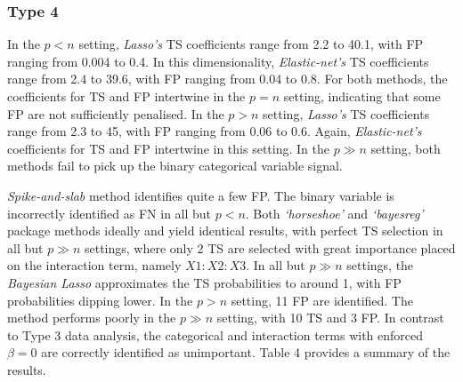 \documentclass[
  11pt,
]{article}
\begin{document}
\subsubsection{Type 4}

In the \(p<n\) setting, \emph{Lasso's} TS coefficients range from 2.2 to
40.1, with FP ranging from 0.004 to 0.4. In this dimensionality,
\emph{Elastic-net's} TS coefficients range from 2.4 to 39.6, with FP
ranging from 0.04 to 0.8. For both methods, the coefficients for TS and
FP intertwine in the \(p=n\) setting, indicating that some FP are not
sufficiently penalised. In the \(p>n\) setting, \emph{Lasso's} TS
coefficients range from 2.3 to 45, with FP ranging from 0.06 to 0.6.
Again, \emph{Elastic-net's} coefficients for TS and FP intertwine in
this setting. In the \(p \gg n\) setting, both methods fail to pick up
the binary categorical variable signal.

\emph{Spike-and-slab} method identifies quite a few FP. The binary
variable is incorrectly identified as FN in all but \(p<n\). Both
\emph{`horseshoe'} and \emph{`bayesreg'} package methods ideally and
yield identical results, with perfect TS selection in all but
\(p \gg n\) settings, where only 2 TS are selected with great importance
placed on the interaction term, namely \(X1:X2:X3\). In all but
\(p \gg n\) settings, the \emph{Bayesian Lasso} approximates the TS
probabilities to around 1, with FP probabilities dipping lower. In the
\(p>n\) setting, 11 FP are identified. The method performs poorly in the
\(p \gg n\) setting, with 10 TS and 3 FP. In contrast to Type 3 data
analysis, the categorical and interaction terms with enforced
\(\beta = 0\) are correctly identified as unimportant. Table 4 provides
a summary of the results.
\end{document}
